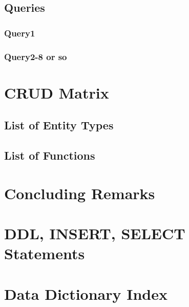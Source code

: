 \documentclass[a4paper,11pt]{article}
\begin{document}
\subsection{Queries}

\subsubsection{Query1}
\subsubsection{Query2-8 or so}

\section{CRUD Matrix}

\subsection{List of Entity Types}
\subsection{List of Functions}

\section{Concluding Remarks}



\pagebreak

\appendix
\section{DDL, INSERT, SELECT Statements}

\section{Data Dictionary Index}
\end{document}
